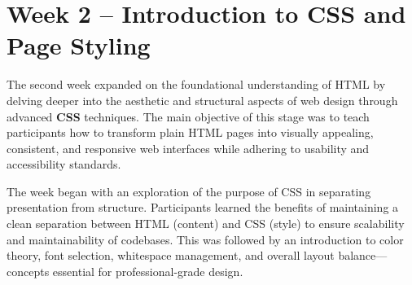 \documentclass[a4paper,12pt,oneside]{report}
\numberwithin{equation}{chapter}
\numberwithin{figure}{chapter}
\numberwithin{table}{chapter}
\begin{document}
\vspace{5mm}
\noindent
\section{Week 2 – Introduction to CSS and Page Styling}

The second week expanded on the foundational understanding of HTML by delving deeper into the aesthetic and structural aspects of web design through advanced \textbf{CSS} techniques. The main objective of this stage was to teach participants how to transform plain HTML pages into visually appealing, consistent, and responsive web interfaces while adhering to usability and accessibility standards.

The week began with an exploration of the purpose of CSS in separating presentation from structure. Participants learned the benefits of maintaining a clean separation between HTML (content) and CSS (style) to ensure scalability and maintainability of codebases. This was followed by an introduction to color theory, font selection, whitespace management, and overall layout balance—concepts essential for professional-grade design.
\end{document}
